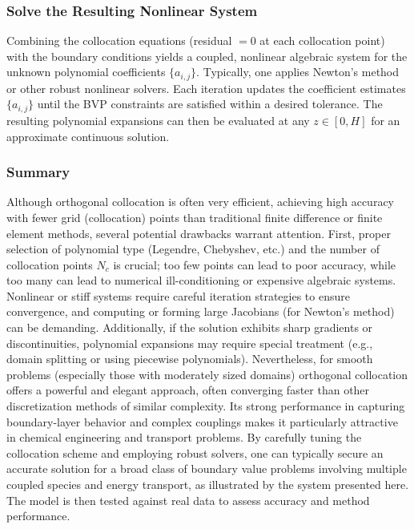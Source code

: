 \documentclass[a4paper,fleqn]{cas-sc}
\begin{document}
    \subsubsection*{Solve the Resulting Nonlinear System}
    Combining the collocation equations (residual $=0$ at each collocation point) with the boundary conditions yields a coupled, nonlinear algebraic system for the unknown polynomial coefficients $\{ a_{i,j} \}$. Typically, one applies Newton’s method or other robust nonlinear solvers. Each iteration updates the coefficient estimates $\{ a_{i,j} \}$ until the BVP constraints are satisfied within a desired tolerance. The resulting polynomial expansions can then be evaluated at any $z \in [0,H]$ for an approximate continuous solution.

    \subsubsection*{Summary}
    Although orthogonal collocation is often very efficient, achieving high accuracy with fewer grid (collocation) points than traditional finite difference or finite element methods, several potential drawbacks warrant attention. First, proper selection of polynomial type (Legendre, Chebyshev, etc.) and the number of collocation points $N_c$ is crucial; too few points can lead to poor accuracy, while too many can lead to numerical ill-conditioning or expensive algebraic systems. Nonlinear or stiff systems require careful iteration strategies to ensure convergence, and computing or forming large Jacobians (for Newton’s method) can be demanding. Additionally, if the solution exhibits sharp gradients or discontinuities, polynomial expansions may require special treatment (e.g., domain splitting or using piecewise polynomials). Nevertheless, for smooth problems (especially those with moderately sized domains) orthogonal collocation offers a powerful and elegant approach, often converging faster than other discretization methods of similar complexity. Its strong performance in capturing boundary-layer behavior and complex couplings makes it particularly attractive in chemical engineering and transport problems. By carefully tuning the collocation scheme and employing robust solvers, one can typically secure an accurate solution for a broad class of boundary value problems involving multiple coupled species and energy transport, as illustrated by the system presented here. The model is then tested against real data to assess accuracy and method performance.
\end{document}
